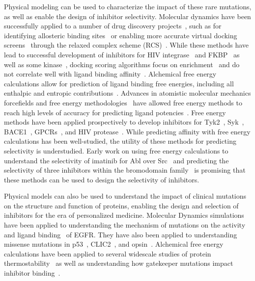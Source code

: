 \documentclass[phd,tocprelim]{cornell}
\begin{document}
Physical modeling can be used to characterize the impact of these rare mutations, as well as enable the design of inhibitor selectivity. Molecular dynamics have been successfully applied to a number of drug discovery projects~\citep{Durrant:2011bm}, such as for identifying allosteric binding sites~\citep{Lin:2003im} or enabling more accurate virtual docking screens~\citep{Kitchen:2004hq} through the relaxed complex scheme (RCS)~\citep{Lin:2003im,Amaro:2008hk}. While these methods have lead to successful development of inhibitors for HIV integrase~\citep{Hazuda:2004ja} and FKBP~\citep{Lin:2003im} as well as some kinase~\citep{Norman:2012gwa},  docking scoring algorithms focus on enrichment~\citep{Shoichet:2004jha} and do not correlate well with ligand binding affinity~\cite{Warren:2006jh}. Alchemical free energy calculations allow for prediction of ligand binding free energies, including all enthalpic and entropic contributions~\citep{Chodera2011-jn,Aldeghi:2016et,Mikulskis:2014df}. Advances in atomistic molecular mechanics forcefields and free energy methodologies~\citep{Huang:J.Comput.Chem.:2013,Maier:J.Chem.TheoryComput.:2015,Harder:J.Chem.TheoryComput.:2016,Cournia:2017ip} have allowed free energy methods to reach high levels of accuracy for predicting ligand potencies~\citep{BROWN2009420}. Free energy methods have been applied prospectively to develop inhibitors for Tyk2~\citep{Abel2017-gw}, Syk~\citep{Lovering:2016fg}, BACE1~\citep{Ciordia:2016dn}, GPCRs~\citep{Lenselink:2016ip}, and HIV protease~\citep{Jorgensen:2016dv}. While predicting affinity with free energy calculations has been well-studied, the utility of these methods for predicting selectivity is understudied. Early work on using free energy calculations to understand the selectivity of imatinib for Abl over Src~\citep{Lin2013-ft,Lin2014-iv} and predicting the selectivity of three inhibitors within the bromodomain family~\citep{Aldeghi2017-ox} is promising that these methods can be used to design the selectivity of inhibitors. 

Physical models can also be used to understand the impact of clinical mutations on the structure and function of proteins, enabling the design and selection of inhibitors for the era of personalized medicine. Molecular Dynamics simulations have been applied to understanding the mechanism of mutations on the activity~\citep{Shan:2012bs,Sutto:2013gy} and ligand binding~\citep{Park:2016ip} of EGFR. They have also been applied to understanding missense mutations in p53~\citep{Demir:2011bc}, CLIC2~\citep{Witham:2011co}, and opsin~\citep{Tsukamoto:2013gr}. Alchemical free energy calculations have been applied to several widescale studies of protein thermostability~\citep{Seeliger:2010hn,Steinbrecher:2017ge,Ford:2017bn} as well as understanding how gatekeeper mutations impact inhibitor binding~\citep{Mondal:2016ju}.
\end{document}

